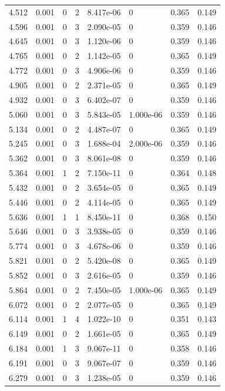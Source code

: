 \documentclass[preview]{standalone}
\begin{document}
{{{\begin{tabular}{L{1.2cm}C{1.2cm} C{0.3cm}C{0.5cm} C{1.4cm}C{1.4cm} C{1.4cm}C{1.4cm}}
  4.512  &  0.001  & 0     &  2 &  8.417e-06  & 0  & 0.365 &  0.149   \\ 
  4.596  &  0.001  & 0     &  3 &  2.090e-05  & 0  & 0.359 &  0.146   \\ 
  4.645  &  0.001  & 0     &  3 &  1.120e-06  & 0  & 0.359 &  0.146   \\ 
  4.765  &  0.001  & 0     &  2 &  1.142e-05  & 0  & 0.365 &  0.149   \\ 
  4.772  &  0.001  & 0     &  3 &  4.906e-06  & 0  & 0.359 &  0.146   \\ 
  4.905  &  0.001  & 0     &  2 &  2.371e-05  & 0  & 0.365 &  0.149   \\ 
  4.932  &  0.001  & 0     &  3 &  6.402e-07  & 0  & 0.359 &  0.146   \\ 
  5.060  &  0.001  & 0     &  3 &  5.843e-05  & 1.000e-06  & 0.359 &  0.146   \\ 
  5.134  &  0.001  & 0     &  2 &  4.487e-07  & 0  & 0.365 &  0.149   \\ 
  5.245  &  0.001  & 0     &  3 &  1.688e-04  & 2.000e-06  & 0.359 &  0.146   \\ 
  5.362  &  0.001  & 0     &  3 &  8.061e-08  & 0  & 0.359 &  0.146   \\ 
  5.364  &  0.001  & 1     &  2 &  7.150e-11  & 0  & 0.364 &  0.148   \\ 
  5.432  &  0.001  & 0     &  2 &  3.654e-05  & 0  & 0.365 &  0.149   \\ 
  5.446  &  0.001  & 0     &  2 &  4.114e-05  & 0  & 0.365 &  0.149   \\ 
  5.636  &  0.001  & 1     &  1 &  8.450e-11  & 0  & 0.368 &  0.150   \\ 
  5.646  &  0.001  & 0     &  3 &  3.938e-05  & 0  & 0.359 &  0.146   \\ 
  5.774  &  0.001  & 0     &  3 &  4.678e-06  & 0  & 0.359 &  0.146   \\ 
  5.821  &  0.001  & 0     &  2 &  5.420e-08  & 0  & 0.365 &  0.149   \\ 
  5.852  &  0.001  & 0     &  3 &  2.616e-05  & 0  & 0.359 &  0.146   \\ 
  5.864  &  0.001  & 0     &  2 &  7.450e-05  & 1.000e-06  & 0.365 &  0.149   \\ 
  6.072  &  0.001  & 0     &  2 &  2.077e-05  & 0  & 0.365 &  0.149   \\ 
  6.114  &  0.001  & 1     &  4 &  1.022e-10  & 0  & 0.351 &  0.143   \\ 
  6.149  &  0.001  & 0     &  2 &  1.661e-05  & 0  & 0.365 &  0.149   \\ 
  6.184  &  0.001  & 1     &  3 &  9.067e-11  & 0  & 0.358 &  0.146   \\ 
  6.191  &  0.001  & 0     &  3 &  9.067e-07  & 0  & 0.359 &  0.146   \\ 
  6.279  &  0.001  & 0     &  3 &  1.238e-05  & 0  & 0.359 &  0.146   \\ 
\hline 
\end{tabular} 

}}}
\end{document}
